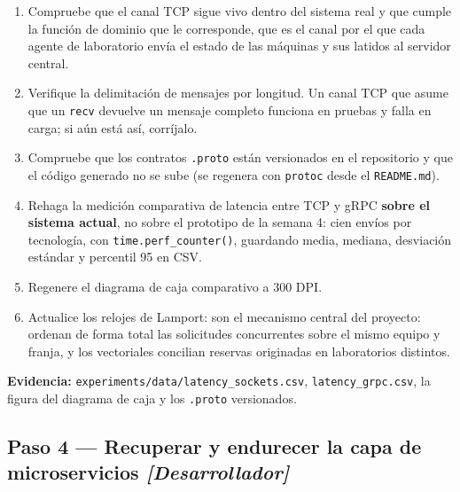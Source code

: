 \documentclass[11pt,a4paper]{article}
\newcommand{\paso}[1]{\subsection{#1}}
\begin{document}
	\begin{enumerate}[leftmargin=*,itemsep=4pt]
		\item Compruebe que el canal TCP sigue vivo dentro del sistema real y que cumple la función de dominio que le corresponde, que es el canal por el que cada agente de laboratorio envía el estado de las máquinas y sus latidos al servidor central.
		\item Verifique la delimitación de mensajes por longitud. Un canal TCP que asume que un \texttt{recv} devuelve un mensaje completo funciona en pruebas y falla en carga; si aún está así, corríjalo.
		\item Compruebe que los contratos \texttt{.proto} están versionados en el repositorio y que el código generado no se sube (se regenera con \texttt{protoc} desde el \texttt{README.md}).
		\item Rehaga la medición comparativa de latencia entre TCP y gRPC \textbf{sobre el sistema actual}, no sobre el prototipo de la semana 4: cien envíos por tecnología, con \texttt{time.perf\_counter()}, guardando media, mediana, desviación estándar y percentil 95 en CSV.
		\item Regenere el diagrama de caja comparativo a 300 DPI.
		\item Actualice los relojes de Lamport: son el mecanismo central del proyecto: ordenan de forma total las solicitudes concurrentes sobre el mismo equipo y franja, y los vectoriales concilian reservas originadas en laboratorios distintos.
	\end{enumerate}
	
	\textbf{Evidencia:} \texttt{experiments/data/latency\_sockets.csv}, \texttt{latency\_grpc.csv}, la figura del diagrama de caja y los \texttt{.proto} versionados.
	
	\paso{Paso 4 --- Recuperar y endurecer la capa de microservicios \emph{[Desarrollador]}}
	
\end{document}

